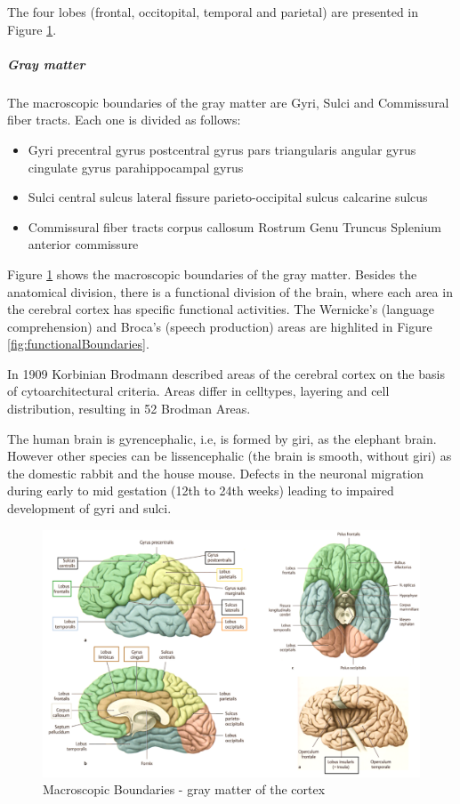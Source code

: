 \documentclass[12pt,article,oneside,a4paper]{memoir}
\begin{document}
The four lobes (frontal, occitopital, temporal and parietal) are presented in Figure \ref{fig:boundaries}.

\subparagraph{Gray matter}
The macroscopic boundaries of the gray matter are Gyri, Sulci and Commissural fiber tracts. Each one is divided as follows:
\begin{itemize}
\item Gyri
\subitem precentral gyrus
\subitem postcentral gyrus
\subitem pars triangularis
\subitem angular gyrus
\subitem cingulate gyrus
\subitem parahippocampal gyrus
\item Sulci
\subitem central sulcus
\subitem lateral fissure
\subitem parieto-occipital sulcus
\subitem calcarine sulcus
\item Commissural fiber tracts
\subitem corpus callosum
\subsubitem Rostrum
\subsubitem Genu
\subsubitem Truncus
\subsubitem Splenium
\subitem anterior commissure
\end{itemize}

Figure \ref{fig:boundaries} shows the macroscopic boundaries of the gray matter. Besides the anatomical division, there is a functional division of the brain, where each area in the cerebral cortex has specific functional activities. The Wernicke's (language comprehension) and Broca's (speech production) areas are highlited in Figure \ref{fig:functionalBoundaries}.

In 1909 Korbinian Brodmann described areas of the cerebral cortex on the basis of
cytoarchitectural criteria. Areas differ in celltypes, layering and cell distribution, resulting in 52 Brodman Areas.

The human brain is gyrencephalic, i.e, is formed by giri, as the elephant brain. However other species can be  lissencephalic (the brain is smooth, without giri) as the domestic rabbit and the house mouse. Defects in the neuronal migration during early to mid gestation (12th to 24th weeks) leading to impaired development of gyri and sulci.

\begin{figure}
  \includegraphics[width=\linewidth]{imgs/macroscopic_boundaries.png}
  \caption{Macroscopic Boundaries - gray matter of the cortex}
  \label{fig:boundaries}
\end{figure}
\end{document}
